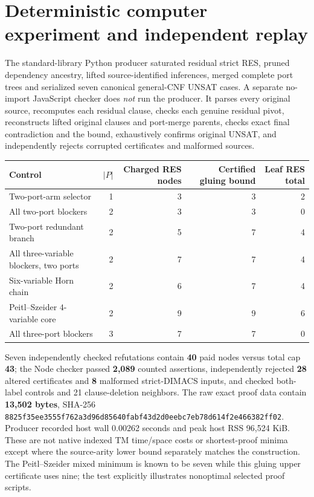 \documentclass[11pt]{article}
\begin{document}
\section*{Deterministic computer experiment and independent replay}
The standard-library Python producer saturated residual strict RES, pruned dependency ancestry, lifted source-identified inferences, merged complete port trees and serialized seven canonical general-CNF UNSAT cases. A separate no-import JavaScript checker does \emph{not} run the producer. It parses every original source, recomputes each residual clause, checks each genuine residual pivot, reconstructs lifted original clauses and port-merge parents, checks exact final contradiction and the bound, exhaustively confirms original UNSAT, and independently rejects corrupted certificates and malformed sources.
\begin{center}
\begin{tabular}{lrrrr}
\toprule
Control & $|P|$ & Charged RES nodes & Certified gluing bound & Leaf RES total\\
\midrule
Two-port-arm selector &1&3&3&2\\
All two-port blockers &2&3&3&0\\
Two-port redundant branch &2&5&7&4\\
All three-variable blockers, two ports &2&7&7&4\\
Six-variable Horn chain &2&6&7&4\\
Peitl--Szeider $4$-variable core &2&9&9&6\\
All three-port blockers &3&7&7&0\\
\bottomrule
\end{tabular}
\end{center}
Seven independently checked refutations contain \textbf{40} paid nodes versus total cap \textbf{43}; the Node checker passed \textbf{2,089} counted assertions, independently rejected \textbf{28} altered certificates and \textbf{8} malformed strict-DIMACS inputs, and checked both-label controls and 21 clause-deletion neighbors. The raw exact proof data contain \textbf{13,502 bytes}, SHA-256 \texttt{8825f35ee3555f762a3d96d85640fabf43d2d0eebc7eb78d614f2e466382ff02}. Producer recorded host wall 0.00262 seconds and peak host RSS 96,524 KiB. These are not native indexed TM time/space costs or shortest-proof minima except where the source-arity lower bound separately matches the construction. The Peitl--Szeider mixed minimum is known to be seven while this gluing upper certificate uses nine; the test explicitly illustrates nonoptimal selected proof scripts.\par
\end{document}
